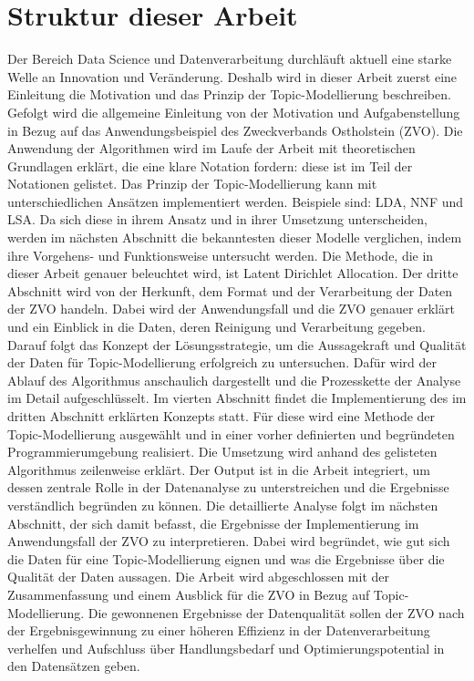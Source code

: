 \documentclass[german,version-2020-11]{uzl-thesis}
\begin{document}
\section{Struktur dieser Arbeit}
Der Bereich Data Science und Datenverarbeitung durchläuft aktuell eine starke Welle an Innovation und Veränderung. Deshalb wird in dieser Arbeit zuerst eine Einleitung die Motivation und das Prinzip der Topic-Modellierung beschreiben. Gefolgt wird die allgemeine Einleitung von der Motivation und Aufgabenstellung in Bezug auf das Anwendungsbeispiel des Zweckverbands Ostholstein (ZVO). Die Anwendung der Algorithmen wird im Laufe der Arbeit mit theoretischen Grundlagen erklärt, die eine klare Notation fordern: diese ist im Teil der Notationen gelistet. Das Prinzip der Topic-Modellierung kann mit unterschiedlichen Ansätzen implementiert werden. Beispiele sind: LDA, NNF und LSA. Da sich diese in ihrem Ansatz und in ihrer Umsetzung unterscheiden, werden im nächsten Abschnitt die bekanntesten dieser Modelle verglichen, indem ihre Vorgehens- und Funktionsweise untersucht werden. Die Methode, die in dieser Arbeit genauer beleuchtet wird, ist Latent Dirichlet Allocation. Der dritte Abschnitt wird von der Herkunft, dem Format und der Verarbeitung der Daten der ZVO handeln. Dabei wird der Anwendungsfall und die ZVO genauer erklärt und ein Einblick in die Daten, deren Reinigung und Verarbeitung gegeben. Darauf folgt das Konzept der Lösungsstrategie, um die Aussagekraft und Qualität der Daten für Topic-Modellierung erfolgreich zu untersuchen. Dafür wird der Ablauf des Algorithmus anschaulich dargestellt und die Prozesskette der Analyse im Detail aufgeschlüsselt. Im vierten Abschnitt findet die Implementierung des im dritten Abschnitt erklärten Konzepts statt. Für diese wird eine Methode der Topic-Modellierung ausgewählt und in einer vorher definierten und begründeten Programmierumgebung realisiert. Die Umsetzung wird anhand des gelisteten Algorithmus zeilenweise erklärt. Der Output ist in die Arbeit integriert, um dessen zentrale Rolle in der Datenanalyse zu unterstreichen und die Ergebnisse verständlich begründen zu können. Die detaillierte Analyse folgt im nächsten Abschnitt, der sich damit befasst, die Ergebnisse der Implementierung im Anwendungsfall der ZVO zu interpretieren. Dabei wird begründet, wie gut sich die Daten für eine Topic-Modellierung eignen und was die Ergebnisse über die Qualität der Daten aussagen. Die Arbeit wird abgeschlossen mit der Zusammenfassung und einem Ausblick für die ZVO in Bezug auf Topic-Modellierung. Die gewonnenen Ergebnisse der Datenqualität sollen der ZVO nach der Ergebnisgewinnung zu einer höheren Effizienz in der Datenverarbeitung verhelfen und Aufschluss über Handlungsbedarf und Optimierungspotential in den Datensätzen geben.
\end{document}
